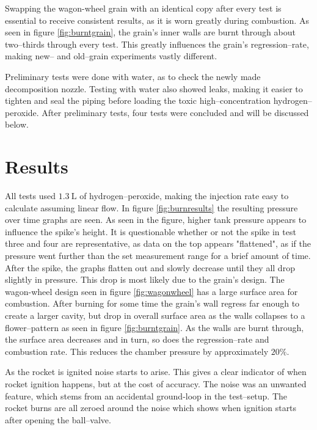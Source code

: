 	Swapping the wagon-wheel grain with an identical copy after every test is essential to receive consistent results, as it is worn greatly during combustion. As seen in figure \ref{fig:burntgrain}, the grain's inner walls are burnt through about two--thirds through every test. This greatly influences the grain's regression--rate, making new-- and old--grain experiments vastly different.

	Preliminary tests were done with water, as to check the newly made decomposition nozzle. Testing with water also showed leaks, making it easier to tighten and seal the piping before loading the toxic high--concentration hydrogen--peroxide. After preliminary tests, four tests were concluded and will be discussed below.

	\section{Results}
	
	All tests used $\SI{1.3}{\liter}$ of hydrogen--peroxide, making the injection rate easy to calculate assuming linear flow.	In figure \ref{fig:burnresults} the resulting pressure over time graphs are seen. As seen in the figure, higher tank pressure appears to influence the spike's height. It is questionable whether or not the spike in test three and four are representative, as data on the top appears "flattened", as if the pressure went further than the set measurement range for a brief amount of time. After the spike, the graphs flatten out and slowly decrease until they all drop slightly in pressure. This drop is most likely due to the grain's design. The wagon-wheel design seen in figure \ref{fig:wagonwheel} has a large surface area for combustion. After burning for some time the grain's wall regress far enough to create a larger cavity, but drop in overall surface area as the walls collapses to a flower--pattern as seen in figure \ref{fig:burntgrain}. As the walls are burnt through, the surface area decreases and in turn, so does the regression--rate and combustion rate. This reduces the chamber pressure by approximately $20\%$. 
	
	As the rocket is ignited noise starts to arise. This gives a clear indicator of when rocket ignition happens, but at the cost of accuracy. The noise was an unwanted feature, which stems from an accidental ground-loop in the test--setup. The rocket burns are all zeroed around the noise which shows when ignition starts after opening the ball--valve. 
	
